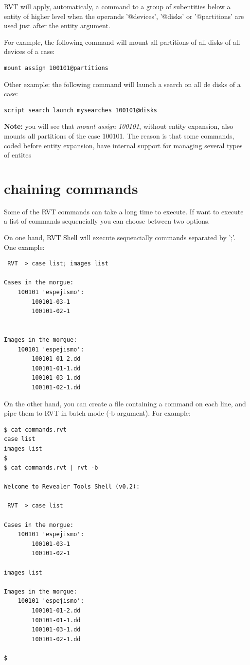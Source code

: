 \documentclass[a4paper,11pt,oneside]{report}
\begin{document}
RVT will apply, automaticaly, a command to a group of subentities below a entity of higher level when the operands '@devices', '@disks' or '@partitions' are used just after the entity argument.

For example, the following command will mount all partitions of all disks of all devices of a case:

\begin{verbatim}
mount assign 100101@partitions
\end{verbatim}

Other example: the following command will launch a search on all de disks of a case:

\begin{verbatim}
script search launch mysearches 100101@disks
\end{verbatim}


\textbf{Note:} you will see that \emph{mount assign 100101}, without entity expansion, also mounts all partitions of the case 100101. The reason is that some commands, coded before entity expansion, have internal support for managing several types of entites


\section{chaining commands}

Some of the RVT commands can take a long time to execute. If want to execute a list of commands sequencially you can choose between two options.

On one hand, RVT Shell will execute sequencially commands separated by ';'. One example:

\begin{verbatim}
 RVT  > case list; images list

Cases in the morgue: 
	100101 'espejismo':
		100101-03-1
		100101-02-1


Images in the morgue: 
	100101 'espejismo':
		100101-01-2.dd
		100101-01-1.dd
		100101-03-1.dd
		100101-02-1.dd
\end{verbatim}

On the other hand, you can create a file containing a command on each line, and pipe them to RVT in batch mode (-b argument). For example:

\begin{verbatim}
$ cat commands.rvt 
case list
images list
$
$ cat commands.rvt | rvt -b

Welcome to Revealer Tools Shell (v0.2):

 RVT  > case list

Cases in the morgue: 
	100101 'espejismo':
		100101-03-1
		100101-02-1

images list

Images in the morgue: 
	100101 'espejismo':
		100101-01-2.dd
		100101-01-1.dd
		100101-03-1.dd
		100101-02-1.dd

$
\end{verbatim}
\end{document}

